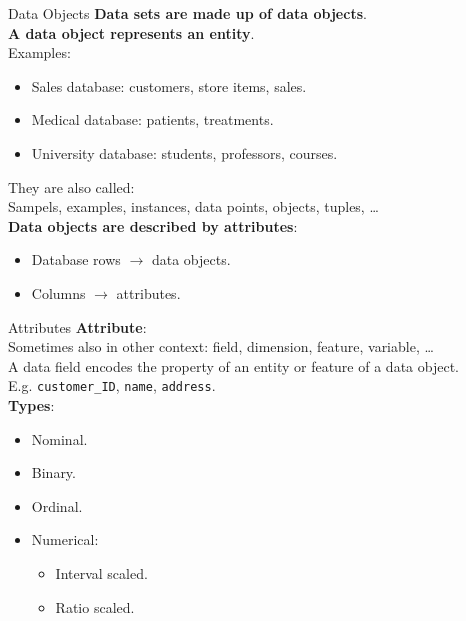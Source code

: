 \begin{frame}{Data Objects}
  \textbf{Data sets are made up of data objects}.\\
  \textbf{A data object represents an entity}.\\[0.2cm]

  Examples:
  \begin{itemize}
  \item Sales database: customers, store items, sales.
  \item Medical database: patients, treatments.
  \item University database: students, professors, courses.
  \end{itemize}

  They are also called:\\
  Sampels, examples, instances, data points, objects, tuples, \ldots\\[0.2cm]

  \textbf{Data objects are described by attributes}:
  \begin{itemize}
  \item Database rows $\rightarrow$ data objects.
  \item Columns $\rightarrow$ attributes.
  \end{itemize}
\end{frame}

\begin{frame}{Attributes}
  \textbf{Attribute}:\\
  Sometimes also in other context: field, dimension, feature, variable, \ldots\\[0.2cm]
  A data field encodes the property of an entity or feature of a data object.\\
  E.g. \texttt{customer\_ID}, \texttt{name}, \texttt{address}.\\[0.5cm]

  \textbf{Types}:
  \begin{itemize}
  \item Nominal.
  \item Binary.
  \item Ordinal.
  \item Numerical:
    \begin{itemize}
    \item Interval scaled.
    \item Ratio scaled.
    \end{itemize}
  \end{itemize}
\end{frame}

